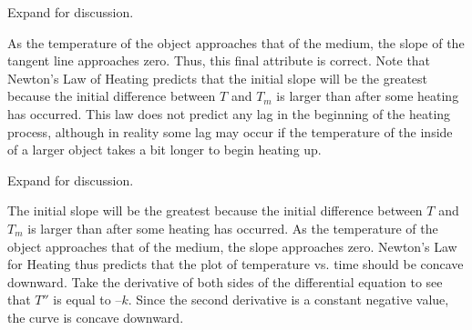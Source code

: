 \documentclass{ximera}
\begin{document}
\begin{problem}
\begin{center}
\end{center}

Expand for discussion.

\begin{expandable}
    As the temperature of the object approaches that of the medium, the slope of the tangent line approaches zero.  Thus, this final attribute is correct.  Note that Newton’s Law of Heating predicts that the initial slope will be the greatest because the initial difference between $T$ and $T_m$ is larger than after some heating has occurred.  This law does not predict any lag in the beginning of the heating process, although in reality some lag may occur if the temperature of the inside of a larger object takes a bit longer to begin heating up. 
 \end{expandable}

\begin{center}  
\end{center}

Expand for discussion.

\begin{expandable}
    The initial slope will be the greatest because the initial difference between $T$ and $T_m$ is larger than after some heating has occurred.  As the temperature of the object approaches that of the medium, the slope approaches zero.  Newton’s Law for Heating thus predicts that the plot of temperature vs. time should be concave downward.  Take the derivative of both sides of the differential equation to see that $T''$ is equal to $–k$.  Since the second derivative is a constant negative value, the curve is concave downward.
 \end{expandable}


\end{problem}
\end{document}
